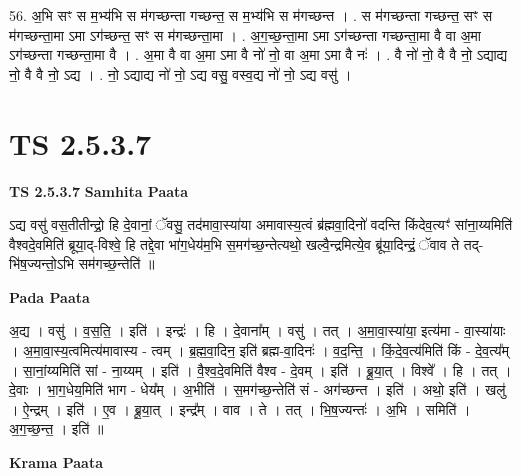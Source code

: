 \documentclass[17pt]{extarticle}
\begin{document}
56. अ॒भि सꣳ स म॒भ्य॑भि स म॑गच्छन्ता गच्छन्त॒ स म॒भ्य॑भि स म॑गच्छन्त । . स म॑गच्छन्ता गच्छन्त॒ सꣳ स म॑गच्छन्ता॒मा ऽमा ऽग॑च्छन्त॒ सꣳ स म॑गच्छन्ता॒मा । . अ॒ग॒च्छ॒न्ता॒मा ऽमा ऽग॑च्छन्ता गच्छन्ता॒मा वै वा अ॒मा ऽग॑च्छन्ता गच्छन्ता॒मा वै । . अ॒मा वै वा अ॒मा ऽमा वै नो॑ नो॒ वा अ॒मा ऽमा वै नः॑ । . वै नो॑ नो॒ वै वै नो॒ ऽद्याद्य नो॒ वै वै नो॒ ऽद्य । . नो॒ ऽद्याद्य नो॑ नो॒ ऽद्य वसु॒ वस्व॒द्य नो॑ नो॒ ऽद्य वसु॑ । \newline
\pagebreak
{}
\section*{ TS 2.5.3.7 }

\textbf{TS 2.5.3.7 } \newline
\textbf{Samhita Paata} \newline

ऽद्य वसु॑ वस॒तीतीन्द्रो॒ हि दे॒वानां॒ ॅवसु॒ तद॑मावा॒स्या॑या अमावास्य॒त्वं ब्र॑ह्मवा॒दिनो॑ वदन्ति किंदेव॒त्यꣳ॑ सांना॒य्यमिति॑ वैश्वदे॒वमिति॑ ब्रूया॒द्-विश्वे॒ हि तद्दे॒वा भा॑ग॒धेय॑म॒भि स॒मग॑च्छ॒न्तेत्यथो॒ खल्वै॒न्द्रमित्ये॒व ब्रू॑या॒दिन्द्रं॒ ॅवाव ते तद्-भि॑ष॒ज्यन्तो॒ऽभि सम॑गच्छ॒न्तेति॑ ॥ \newline

\textbf{Pada Paata} \newline

अ॒द्य । वसु॑ । व॒स॒ति॒ । इति॑ । इन्द्रः॑ । हि । दे॒वाना᳚म् । वसु॑ । तत् । अ॒मा॒वा॒स्या॑या॒ इत्य॑मा - वा॒स्या॑याः । अ॒मा॒वा॒स्य॒त्वमित्य॑मावास्य - त्वम् । ब्र॒ह्म॒वा॒दिन॒ इति॑ ब्रह्म-वा॒दिनः॑ । व॒द॒न्ति॒ । किं॒दे॒व॒त्य॑मिति॑ किं - दे॒व॒त्य᳚म् । सा॒नां॒य्यमिति॑ सां - ना॒य्यम् । इति॑ । वै॒श्व॒दे॒वमिति॑ वैश्व - दे॒वम् । इति॑ । ब्रू॒या॒त् । विश्वे᳚ । हि । तत् । दे॒वाः । भा॒ग॒धेय॒मिति॑ भाग - धेय᳚म् । अ॒भीति॑ । स॒मग॑च्छ॒न्तेति॑ सं - अग॑च्छन्त । इति॑ । अथो॒ इति॑ । खलु॑ । ऐ॒न्द्रम् । इति॑ । ए॒व । ब्रू॒या॒त् । इन्द्र᳚म् । वाव । ते । तत् । भि॒ष॒ज्यन्तः॑ । अ॒भि । समिति॑ । अ॒ग॒च्छ॒न्त॒ । इति॑ ॥  \newline


\textbf{Krama Paata} \newline
\end{document}
